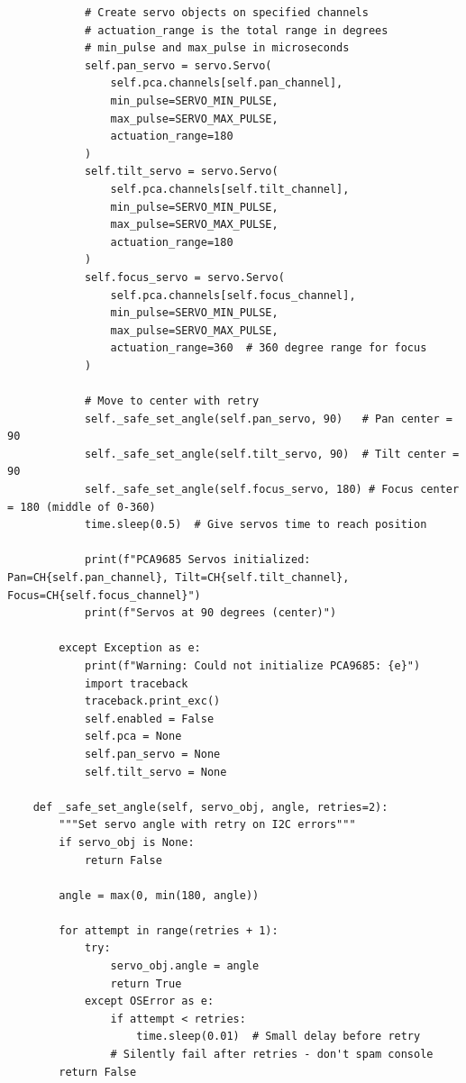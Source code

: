 \documentclass[11pt,a4paper]{article}
\begin{document}
\begin{lstlisting}
            # Create servo objects on specified channels
            # actuation_range is the total range in degrees
            # min_pulse and max_pulse in microseconds
            self.pan_servo = servo.Servo(
                self.pca.channels[self.pan_channel],
                min_pulse=SERVO_MIN_PULSE,
                max_pulse=SERVO_MAX_PULSE,
                actuation_range=180
            )
            self.tilt_servo = servo.Servo(
                self.pca.channels[self.tilt_channel],
                min_pulse=SERVO_MIN_PULSE,
                max_pulse=SERVO_MAX_PULSE,
                actuation_range=180
            )
            self.focus_servo = servo.Servo(
                self.pca.channels[self.focus_channel],
                min_pulse=SERVO_MIN_PULSE,
                max_pulse=SERVO_MAX_PULSE,
                actuation_range=360  # 360 degree range for focus
            )
            
            # Move to center with retry
            self._safe_set_angle(self.pan_servo, 90)   # Pan center = 90
            self._safe_set_angle(self.tilt_servo, 90)  # Tilt center = 90
            self._safe_set_angle(self.focus_servo, 180) # Focus center = 180 (middle of 0-360)
            time.sleep(0.5)  # Give servos time to reach position
            
            print(f"PCA9685 Servos initialized: Pan=CH{self.pan_channel}, Tilt=CH{self.tilt_channel}, Focus=CH{self.focus_channel}")
            print(f"Servos at 90 degrees (center)")
            
        except Exception as e:
            print(f"Warning: Could not initialize PCA9685: {e}")
            import traceback
            traceback.print_exc()
            self.enabled = False
            self.pca = None
            self.pan_servo = None
            self.tilt_servo = None
    
    def _safe_set_angle(self, servo_obj, angle, retries=2):
        """Set servo angle with retry on I2C errors"""
        if servo_obj is None:
            return False
        
        angle = max(0, min(180, angle))
        
        for attempt in range(retries + 1):
            try:
                servo_obj.angle = angle
                return True
            except OSError as e:
                if attempt < retries:
                    time.sleep(0.01)  # Small delay before retry
                # Silently fail after retries - don't spam console
        return False
    

\end{lstlisting}
\end{document}
